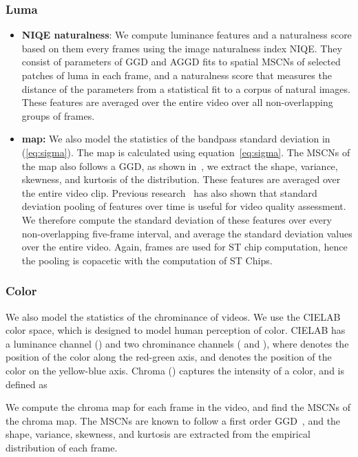 \documentclass[journal]{IEEEtran}
\begin{document}
\subsubsection{Luma}
\begin{itemize}
    \item
    \textbf{NIQE naturalness}: We compute luminance features and a naturalness score based on them every  frames using the image naturalness index NIQE. They consist of parameters of GGD and AGGD fits to spatial MSCNs of selected patches of luma in each frame, and a naturalness score that measures the distance of the parameters from a statistical fit to a corpus of natural images. These features are averaged over the entire video over all non-overlapping groups of  frames.
    \item \textbf{ map:} We also model the statistics of the bandpass standard deviation  in (\ref{eq:sigma}). The  map is calculated using equation~\ref{eq:sigma}. The MSCNs of the  map also follows a GGD, as shown in~\cite{ruderman}, we extract the shape, variance, skewness, and kurtosis of the distribution. These features are averaged over the entire video clip. Previous research~\cite{videval,tlvqm,gmsd} has also shown that standard deviation pooling of features over time is useful for video quality assessment. We therefore compute the standard deviation of these features over every non-overlapping five-frame interval, and average the standard deviation values over the entire video. Again,  frames are used for ST chip computation, hence the pooling is copacetic with the computation of ST Chips. 
\end{itemize}




\subsubsection{Color}

We also model the statistics of the chrominance of videos. We use the CIELAB~\cite{cielab} color space, which is designed to model human perception of color. CIELAB has a luminance channel () and two chrominance channels ( and ), where  denotes the position of the color along the red-green axis, and  denotes the position of the color on the yellow-blue axis. Chroma () captures the intensity of a color, and is defined as 


We compute the chroma map for each frame in the video, and find the MSCNs of the chroma map. The MSCNs are known to follow a first order GGD~\cite{friquee}, and the shape, variance, skewness, and kurtosis are extracted from the empirical distribution of each frame. 
\end{document}
